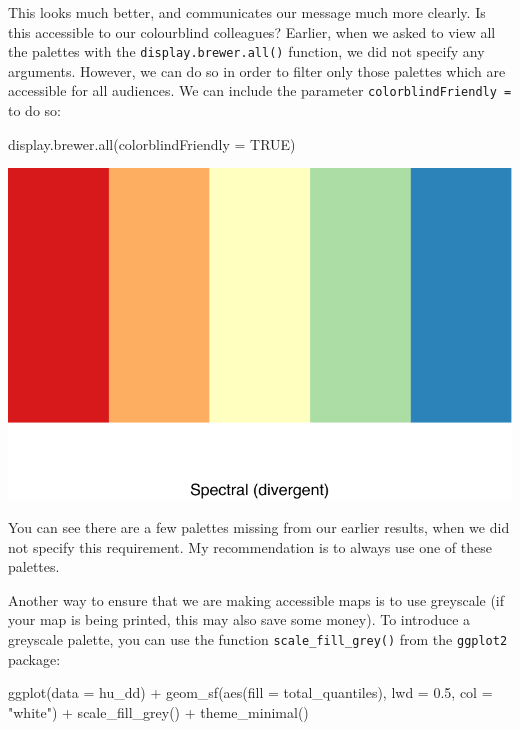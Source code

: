 \documentclass[
]{book}
\newenvironment{Shaded}{\begin{snugshade}}{\end{snugshade}}
\newcommand{\AttributeTok}[1]{\textcolor[rgb]{0.77,0.63,0.00}{#1}}
\newcommand{\ConstantTok}[1]{\textcolor[rgb]{0.00,0.00,0.00}{#1}}
\newcommand{\FloatTok}[1]{\textcolor[rgb]{0.00,0.00,0.81}{#1}}
\newcommand{\FunctionTok}[1]{\textcolor[rgb]{0.00,0.00,0.00}{#1}}
\newcommand{\NormalTok}[1]{#1}
\newcommand{\SpecialCharTok}[1]{\textcolor[rgb]{0.00,0.00,0.00}{#1}}
\newcommand{\StringTok}[1]{\textcolor[rgb]{0.31,0.60,0.02}{#1}}
\begin{document}
This looks much better, and communicates our message much more clearly. Is this accessible to our colourblind colleagues? Earlier, when we asked to view all the palettes with the \texttt{display.brewer.all()} function, we did not specify any arguments. However, we can do so in order to filter only those palettes which are accessible for all audiences. We can include the parameter \texttt{colorblindFriendly\ =} to do so:

\begin{Shaded}
\begin{Highlighting}[]
\FunctionTok{display.brewer.all}\NormalTok{(}\AttributeTok{colorblindFriendly =} \ConstantTok{TRUE}\NormalTok{)}
\end{Highlighting}
\end{Shaded}

\includegraphics{crime_mapping_files/figure-latex/unnamed-chunk-157-1.pdf}

You can see there are a few palettes missing from our earlier results, when we did not specify this requirement. My recommendation is to always use one of these palettes.

Another way to ensure that we are making accessible maps is to use greyscale (if your map is being printed, this may also save some money). To introduce a greyscale palette, you can use the function \texttt{scale\_fill\_grey()} from the \texttt{ggplot2} package:

\begin{Shaded}
\begin{Highlighting}[]
\FunctionTok{ggplot}\NormalTok{(}\AttributeTok{data =}\NormalTok{ hu\_dd) }\SpecialCharTok{+} 
  \FunctionTok{geom\_sf}\NormalTok{(}\FunctionTok{aes}\NormalTok{(}\AttributeTok{fill =}\NormalTok{ total\_quantiles), }\AttributeTok{lwd =} \FloatTok{0.5}\NormalTok{, }\AttributeTok{col =} \StringTok{"white"}\NormalTok{) }\SpecialCharTok{+} 
  \FunctionTok{scale\_fill\_grey}\NormalTok{() }\SpecialCharTok{+} 
  \FunctionTok{theme\_minimal}\NormalTok{()}
\end{Highlighting}
\end{Shaded}
\end{document}
